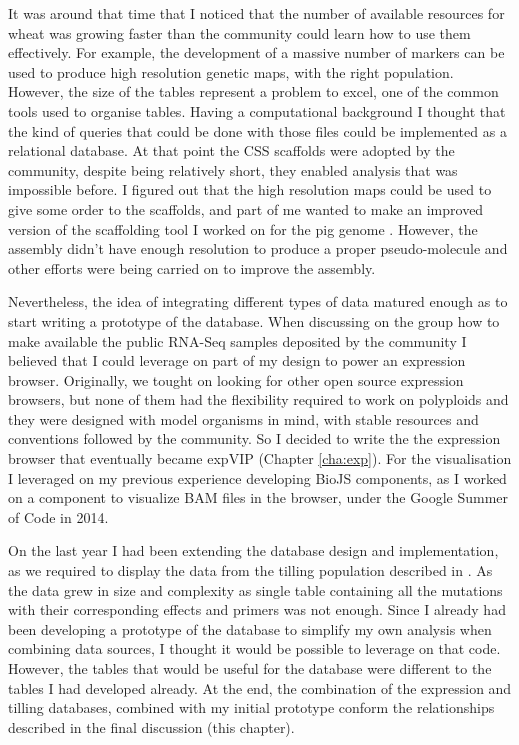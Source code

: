 It was around that time that I noticed that the number of available resources for wheat was growing faster than the community could learn how to use them effectively. 
For example, the development of a massive number of markers can be used to produce high resolution genetic maps, with the right population. 
However, the size of the tables represent a problem to excel, one of the common tools used to organise tables. 
Having a computational background I thought that the kind of queries that could be done with those files could be implemented as a relational database. 
At that point the CSS scaffolds were adopted by the community, despite being relatively short, they enabled analysis that was impossible before. 
I figured out that the high resolution maps could be used to give some order to the scaffolds, and part of me wanted to make an improved version of the scaffolding tool I worked on for the pig genome \citep{Groenen2012a}.
However, the assembly didn't have enough resolution to produce a proper pseudo-molecule and other efforts were being carried on to improve the assembly.

Nevertheless, the idea of integrating different types of data matured enough as to start writing a prototype of the database. 
When discussing on the group how to make available the public RNA-Seq samples deposited by the community I believed that I could leverage on part of my design to power an expression browser. 
Originally, we tought on looking for other open source expression browsers, but none of them had the flexibility required to work on polyploids and they were designed with model organisms in mind, with stable resources and conventions followed by the community. 
So I decided to write the the expression browser that eventually became expVIP (Chapter \ref{cha:exp}). 
For the visualisation I leveraged on my previous experience developing BioJS components, as I worked on a component to visualize BAM files in the browser, under the Google Summer of Code in 2014. 

On the last year I had been extending the database design and implementation, as we required to display the data from the tilling population described in \citet{Krasileva2016}. 
As the data grew in size and complexity as single table containing all the mutations with their corresponding effects and primers was not enough. 
Since I already had been developing a prototype of the database to simplify my own analysis when combining data sources, I thought it would be possible to leverage on that code. 
However, the tables that would be useful for the database were different to the tables I had developed already. 
At the end, the combination of the expression and tilling databases, combined with my initial prototype conform the relationships described in the final discussion (this chapter). 

